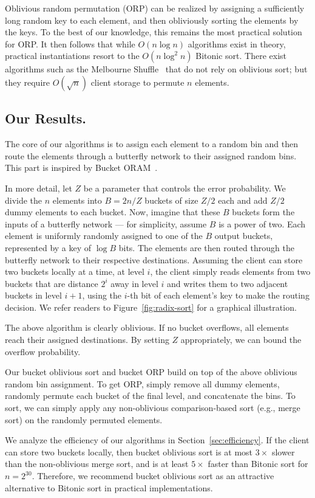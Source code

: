 Oblivious random permutation (ORP) can be realized by assigning a sufficiently long random key to each element, and then obliviously sorting the elements by the keys.
To the best of our knowledge, this remains the most practical solution for ORP.
It then follows that while $O(n \log n)$ algorithms exist in theory, practical instantiations resort to the $O(n \log^2 n)$ Bitonic sort.
There exist algorithms such as the Melbourne
Shuffle~\cite{ohrimenko2014melbourne} that do not rely on
oblivious sort; but they require $O(\sqrt{n})$ client storage to permute $n$ elements.

\subsection{Our Results.}
The core of our algorithms is to assign each element to a random bin and then route the elements through a butterfly network to their assigned random bins. 
This part is inspired by Bucket ORAM~\cite{fletcher2015bucket}. 

In more detail, let $Z$ be a parameter that controls the error probability. 
We divide the $n$ elements into $B=2n/Z$ buckets of size $Z/2$ each and add $Z/2$ dummy elements to each bucket.
Now, imagine that these $B$ buckets form the inputs of a butterfly network --- for simplicity, assume $B$ is a power of two.
Each element is uniformly randomly assigned to one of the $B$ output buckets, represented by a key of $\log B$ bits.
The elements are then routed through the butterfly network to their respective destinations.
Assuming the client can store two buckets locally at a time, at level $i$, the client simply reads elements from two buckets that are distance $2^i$ away in level $i$ and writes them to two adjacent buckets in level $i+1$, using the $i$-th bit of each element's key to make the routing decision. 
We refer readers to Figure~\ref{fig:radix-sort} for a graphical illustration.

The above algorithm is clearly oblivious.
If no bucket overflows, all elements reach their assigned destinations. 
By setting $Z$ appropriately, we can bound the overflow probability.

Our bucket oblivious sort and bucket ORP build on top of the above oblivious random bin assignment. 
To get ORP, simply remove all dummy elements, randomly permute each bucket of the final level, and concatenate the bins.
To sort, we can simply apply any non-oblivious comparison-based sort (e.g., merge sort) on the randomly permuted elements. 

We analyze the efficiency of our algorithms in Section~\ref{sec:efficiency}.
If the client can store two buckets locally, then bucket oblivious sort is at most $3\times$ slower than the non-oblivious merge sort, and is at least $5\times$ faster than Bitonic sort for $n=2^{30}$.
Therefore, we recommend bucket oblivious sort as an attractive alternative to Bitonic sort in practical implementations.

